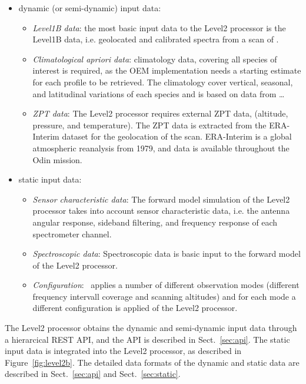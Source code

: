 \begin{itemize}
  \item dynamic (or semi-dynamic) input data:
  \begin{itemize}

    \item \emph{Level1B data}: the most basic input data to the 
    Level2 processor is the Level1B data, i.e. geolocated and 
    calibrated spectra from a scan of \smr.
    
    \item \emph{Climatological \textit{apriori} data}:
    climatology data, covering all species of interest is required, as
    the OEM implementation needs a starting estimate for each profile
    to be retrieved. The climatology cover vertical, seasonal,
    and latitudinal variations of each species and is based on data
    from \dots{}\

    \item \emph{ZPT data}:
    The Level2 processor requires external ZPT data,
    (altitude, pressure, and temperature).
    The ZPT data is extracted from the ERA-Interim dataset for the geolocation
    of the scan. ERA-Interim is a global atmospheric reanalysis from 1979, and
    data is available throughout the Odin mission.
  \end{itemize}
  \item static input data:
  \begin{itemize}
    \item \emph{Sensor characteristic data}:
    The forward model simulation of the Level2 processor takes into account
    sensor characteristic data, i.e. the antenna angular response,
    sideband filtering, and frequency response of each spectrometer channel.

    \item \emph{Spectroscopic data}:
    Spectroscopic data is basic input to the forward model of the Level2
    processor.

    \item \emph{Configuration}:
    \smr\ applies a number of different observation modes
    (different frequency intervall coverage and scanning altitudes) 
    and for each mode a different configuration is applied
    of the Level2 processor.
  \end{itemize}
\end{itemize}


The Level2 processor obtains the dynamic 
and semi-dynamic input data through a hierarcical
REST API, and the API is described in Sect.~\ref{sec:api}.
The static input data is integrated into the
Level2 processor, as described in Figure~\ref{fig:level2b}. 
The detailed data formats of the dynamic 
and static data are described in 
Sect.~\ref{sec:api} and Sect.~\ref{sec:static}.


